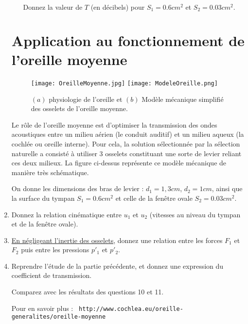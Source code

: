 \documentclass[10pt, a4paper]{article}
\begin{document}
\begin{enumerate}
\begin{enumerate}
Donnez la valeur de $T$ (en décibels) pour $S_1 = 0.6 cm^2$ et $S_2= 0.03 cm^2$.

\end{enumerate}

\section{Application au fonctionnement de l'oreille moyenne}

\begin{figure}
\texttt{[image: OreilleMoyenne.jpg]}
\texttt{[image: ModeleOreille.png]}
\caption{$(a)$ physiologie de l'oreille et $(b)$ Modèle mécanique simplifié des osselets de l'oreille moyenne.}
\end{figure}

Le rôle de l'oreille moyenne est d'optimiser la transmission des ondes acoustiques entre un milieu aérien (le conduit auditif) et un milieu aqueux (la cochlée ou oreille interne).
Pour cela, la solution sélectionnée par la sélection naturelle a consisté à utiliser 3 osselets constituant une sorte de levier reliant ces deux milieux. 
La figure ci-dessus représente ce modèle mécanique de manière très schématique.

On donne les dimensions des bras de levier : $d_1 = 1,3cm$, $d_2 = 1cm$, 
ainsi que la surface du tympan $S_1 = 0.6cm^2$ et celle de la fenêtre ovale $S_2= 0.03cm^2$.
 
\item 
Donnez la relation cinématique entre $u_1$ et $u_2$ (vitesses au niveau du tympan et de la fenêtre ovale).

\item \underline{ En négligeant l'inertie des osselets}, donnez une relation entre les forces $F_1$ et $F_2$  puis entre les pressions $p'_1$ et $p'_2$.

\item Reprendre l'étude de la partie précédente, et donnez une expression du coefficient 
de transmission.

Comparez avec les résultats des questions 10 et 11.





Pour en savoir plus :
\verb| http://www.cochlea.eu/oreille-generalites/oreille-moyenne |
  
\end{enumerate}



 




\end{document}
